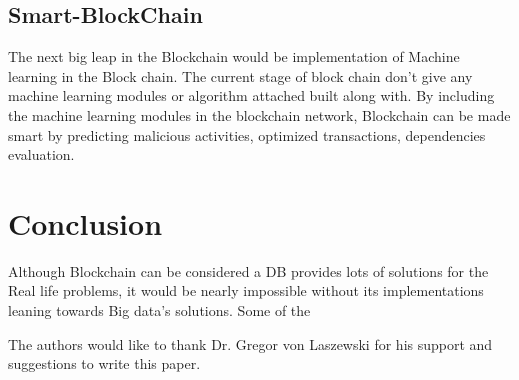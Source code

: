 \documentclass[sigconf]{acmart}
\begin{document}
\subsection{Smart-BlockChain}
The next big leap in the Blockchain would be implementation of Machine learning in the Block chain. The current stage of block chain don't give any machine learning modules or algorithm attached built along with. By including the machine learning modules in the blockchain network, Blockchain can be made smart by predicting malicious activities, optimized transactions, dependencies evaluation.


\section{Conclusion}
Although Blockchain can be considered a DB provides lots of solutions for the Real life problems, it would be nearly impossible without its implementations leaning towards Big data's solutions. Some of the 



\begin{acks}

  The authors would like to thank Dr. Gregor von Laszewski for his
  support and suggestions to write this paper.

\end{acks}


 
\end{document}
